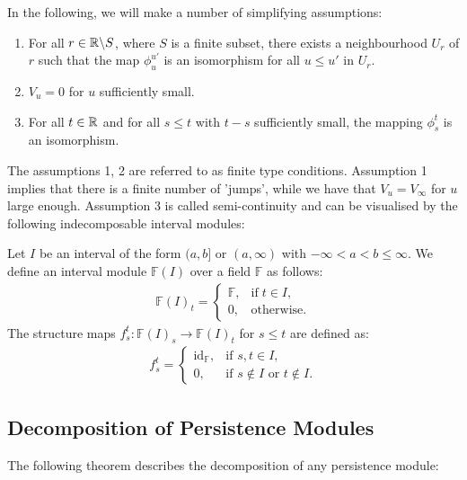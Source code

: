 In the following, we will make a number of simplifying assumptions:

\begin{assume}\noindent
\begin{enumerate}
	\item For all $r \in {\mathbb{R}}\backslash S$, where $S$ is a finite subset, there exists a neighbourhood $U_r$ of $r$ such that the map $\phi_u^{u'}$ is an isomorphism for all $u \leq u'$ in $U_r$.
	\item $V_u = 0$ for $u$ sufficiently small.
	\item For all $t \in {\mathbb{R}}$ and for all $s \leq t$ with $t-s$ sufficiently small, the mapping $\phi_s^t$ is an isomorphism.
\end{enumerate}
\end{assume}

The assumptions 1, 2 are referred to as finite type conditions. Assumption 1 implies that there is a finite number of 'jumps', while we have that $V_u = V_\infty$ for $u$ large enough. Assumption 3 is called semi-continuity and can be visualised by the following indecomposable interval modules:

\begin{definition}
Let $I$ be an interval of the form $(a,b]$ or $(a,\infty)$ with $-\infty < a < b \leq \infty$. We define an interval module $\mathbb{F}(I)$ over a field $\mathbb{F}$ as follows:
\begin{align}
	\mathbb{F}(I)_t = 
	\begin{cases}
		\mathbb{F}, & \text{if} \; t \in I, \\
		0, & \text{otherwise}.
	\end{cases}
\end{align}
The structure maps $f_{s}^t: \mathbb{F}(I)_s \to \mathbb{F}(I)_t$ for $s \leq t$ are defined as:
\begin{align}
	f_{s}^t = 
	\begin{cases}
		\mathrm{id}_{\mathbb{F}}, & \text{if } s, t \in I, \\
		0, & \text{if } s \notin I \text{ or } t \notin I.
	\end{cases}
\end{align}
\end{definition}

\subsection{Decomposition of Persistence Modules}
The following theorem describes the decomposition of any persistence module:

